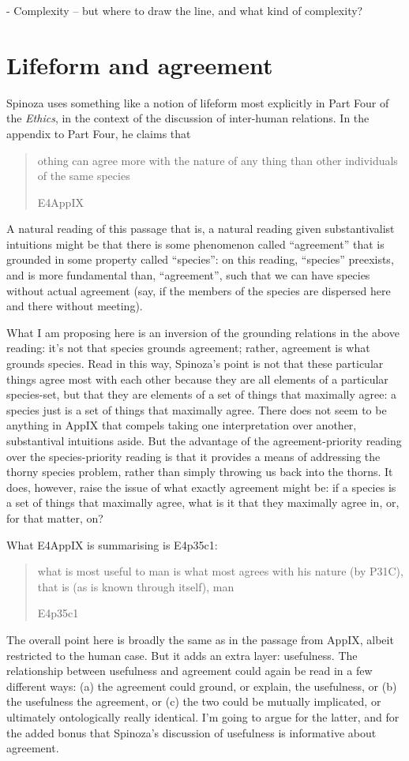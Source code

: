 \documentclass{article}
\newcommand{\dash}{\unskip{—}}
\newcommand\foreign[2]{\foreignlanguage{#1}{\emph{#2}}}
\newcommand\texttitle[1]{\emph{#1}}
\begin{document}
- Complexity – but where to draw the line, and what kind of complexity?

\section{Lifeform and agreement}\label{sec:Agreement}
Spinoza uses something like a notion of lifeform most explicitly in Part Four of the \texttitle{Ethics}, in the context of the discussion of inter-human relations. In the appendix to Part Four, he claims that \blockquote[E4App\RN{9}]{othing can agree \textins{\foreign{latin}{convenire}} more with the nature of any thing than other individuals of the same species}. A natural reading of this passage \dash that is, a natural reading given substantivalist intuitions \dash might be that there is some phenomenon called \enquote{agreement} that is grounded in some property called \enquote{species}: on this reading, \enquote{species} preexists, and is more fundamental than, \enquote{agreement}, such that we can have species without actual agreement (say, if the members of the species are dispersed here and there without meeting).

What I am proposing here is an inversion of the grounding relations in the above reading: it's not that species grounds agreement; rather, agreement is what grounds species. Read in this way, Spinoza's point is not that these particular things agree most with each other because they are all elements of a particular species-set, but that they are elements of a set of things that maximally agree: a species just is a set of things that maximally agree. There does not seem to be anything in App\RN{9} that compels taking one interpretation over another, substantival intuitions aside. But the advantage of the agreement-priority reading over the species-priority reading is that it provides a means of addressing the thorny species problem, rather than simply throwing us back into the thorns. It does, however, raise the issue of what exactly agreement might be: if a species is a set of things that maximally agree, what is it that they maximally agree in, or, for that matter, on?

What E4App\RN{9} is summarising is E4p35c1: \blockquote[E4p35c1]{what is most useful to man is what most agrees \textins{\foreign{latin}{convenit}} with his nature (by P31C), that is (as is known through itself), man}. The overall point here is broadly the same as in the passage from App\RN{9}, albeit restricted to the human case. But it adds an extra layer: usefulness. The relationship between usefulness and agreement could again be read in a few different ways: (a) the agreement could ground, or explain, the usefulness, or (b) the usefulness the agreement, or (c) the two could be mutually implicated, or ultimately ontologically really identical. I'm going to argue for the latter, and for the added bonus that Spinoza's discussion of usefulness is informative about agreement.
\end{document}
